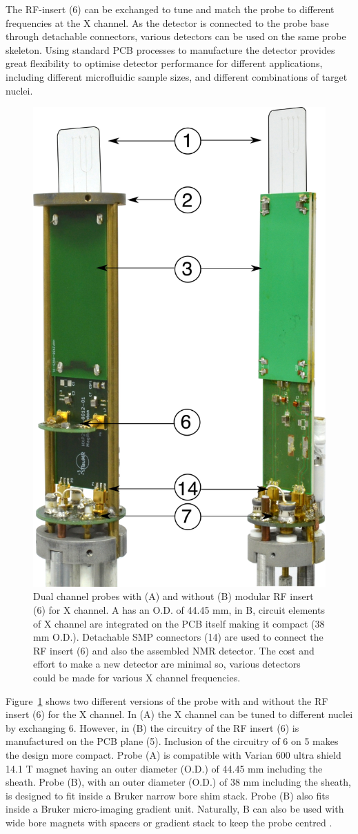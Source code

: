 \documentclass[preprint,12pt]{article}
\begin{document}
The RF-insert (6) can be exchanged to tune and match the probe to different frequencies 
at the X channel. As the detector is connected to the probe base through detachable 
connectors, various detectors can be used on the same probe skeleton. 
Using standard PCB processes to manufacture the detector provides great flexibility
to optimise detector performance for different applications, including different
microfluidic sample sizes, and different combinations of target nuclei.
\par
\begin{figure}
\centering
\includegraphics[width=.5\linewidth,keepaspectratio=true]{./figures/ms5n17-tlp-im-181007-both-detectors.png}
\caption{Dual channel probes with (A) and without (B) modular RF insert (6) for X channel. A has an O.D. of 44.45 mm, in B, circuit elements of X channel are integrated on the PCB itself making it compact (38 mm O.D.). Detachable SMP connectors (14) are used to connect the RF insert (6) and also the assembled NMR detector. The cost and effort to make a new detector are minimal so, various detectors could be made for various X channel frequencies.}
\label{fig:ProbePhoto}
\end{figure}
Figure~\ref{fig:ProbePhoto} shows two different versions of the probe with and without the RF insert (6) for the X channel. In (A) the X channel can be tuned to different nuclei by exchanging 6. However, in (B) the circuitry of the RF insert (6) is manufactured on the PCB plane (5). Inclusion of the circuitry of 6 on 5 makes the design more compact. Probe (A) is compatible with Varian 600 ultra shield 14.1 T magnet having an outer diameter (O.D.) of 44.45 mm including the sheath. Probe (B), with an outer diameter (O.D.) of 38 mm including the sheath, is designed to fit inside a Bruker narrow bore shim stack. Probe (B) also fits inside a Bruker micro-imaging gradient unit. Naturally, B can also be used with wide bore magnets with spacers or gradient stack to keep the probe centred .\par
\end{document}
